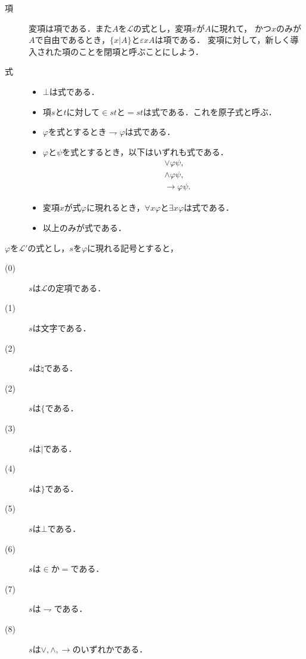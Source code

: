 \documentclass[a4j,10.5pt,oneside,openany]{jsbook}
\theoremstyle{mystyle}
\begin{document}
	\begin{description}
		\item[項] 変項は項である．また$A$を$\mathcal{L}$の式とし，変項$x$が$A$に現れて，
			かつ$x$のみが$A$で自由であるとき，$\{x|A\}$と$\varepsilon x A$は項である．
			変項に対して，新しく導入された項のことを閉項と呼ぶことにしよう．
			
		\item[式] 
			\begin{itemize}
				\item $\bot$は式である．
				\item 項$s$と$t$に対して$\in st$と$=st$は式である．これを原子式と呼ぶ．
				\item $\varphi$を式とするとき$\rightharpoondown \varphi$は式である．
				\item $\varphi$と$\psi$を式とするとき，以下はいずれも式である．
					\begin{align}
						&\vee \varphi \psi, \\
						&\wedge \varphi \psi, \\
						&\rightarrow \varphi \psi.
					\end{align}
			
				\item 変項$x$が式$\varphi$に現れるとき，$\forall x \varphi$と$\exists x \varphi$は式である．
			
				\item 以上のみが式である．
		\end{itemize}
	\end{description}
	
	$\varphi$を$\mathcal{L}'$の式とし，$s$を$\varphi$に現れる記号とすると，
	\begin{description}
		\item[(0)] $s$は$\mathcal{L}$の定項である．
		\item[(1)] $s$は文字である．
		\item[(2)] $s$は$\natural$である．
		\item[(2)] $s$は$\{$である．
		\item[(3)] $s$は$|$である．
		\item[(4)] $s$は$\}$である．
		\item[(5)] $s$は$\bot$である．
		\item[(6)] $s$は$\in$か$=$である．
		\item[(7)] $s$は$\rightharpoondown$である．
		\item[(8)] $s$は$\vee,\wedge,\rightarrow$のいずれかである．
	\end{description}
	
\end{document}
